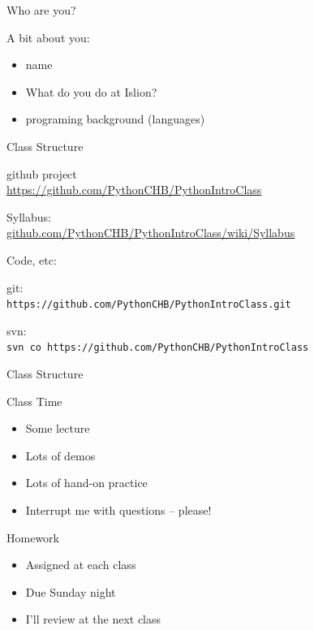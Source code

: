 \documentclass{beamer}
\begin{document}
\begin{frame}{Who are you?}

{\Large A bit about you:}
\begin{itemize}
  \item name
  \item What do you do at Islion?
  \item programing background (languages)
\end{itemize}

\end{frame}


\begin{frame}[fragile]{Class Structure}

{\LARGE github project} \\
\url{https://github.com/PythonCHB/PythonIntroClass}

\vspace{0.2in}
{\large Syllabus:} \\
\url{github.com/PythonCHB/PythonIntroClass/wiki/Syllabus} 

\vspace{0.2in}
{\large Code, etc:}

git: \\
\verb+https://github.com/PythonCHB/PythonIntroClass.git+

svn: \\
\verb+svn co https://github.com/PythonCHB/PythonIntroClass+

\end{frame}

\begin{frame}{Class Structure}

{\Large Class Time}
  \begin{itemize}
     \item Some lecture
     \item Lots of demos
     \item Lots of hand-on practice
     \item Interrupt me with questions -- please!
  \end{itemize}

\vspace{0.25in}
{\Large Homework}
  \begin{itemize}
     \item Assigned at each class
     \item Due Sunday night
     \item I'll review at the next class
  \end{itemize}


\end{frame}
\end{document}
